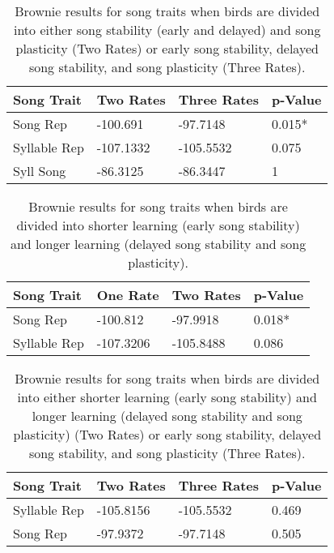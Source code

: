 \documentclass[a4paper,12pt]{article}
\begin{document}
\begin{table}[ht]
\caption{Brownie results for song traits when birds are divided into either song stability (early and delayed) and song plasticity (Two Rates) or early song stability, delayed song stability, and song plasticity (Three Rates).}
\centering
\begin{tabular}{llll}
  \hline
Song Trait & Two Rates & Three Rates & p-Value \\ 
  \hline
    Song Rep & -100.691 & -97.7148 & 0.015* \\ 
Syllable Rep & -107.1332 & -105.5532 & 0.075 \\ 
  Syll Song & -86.3125 & -86.3447 & 1 \\ 
   \hline
\end{tabular}
\end{table}



\begin{table}[ht]
\caption{Brownie results for song traits when birds are divided into shorter learning (early song stability) and longer learning (delayed song stability and song plasticity).}
\centering
\begin{tabular}{llll}
  \hline
Song Trait & One Rate & Two Rates & p-Value \\ 
  \hline
Song Rep & -100.812 & -97.9918 & 0.018* \\ 
  Syllable Rep & -107.3206 & -105.8488 & 0.086 \\ 
   \hline
\end{tabular}
\end{table}



\begin{table}[ht]
\caption{Brownie results for song traits when birds are divided into either shorter learning (early song stability) and longer learning (delayed song stability and song plasticity) (Two Rates) or early song stability, delayed song stability, and song plasticity (Three Rates).}
\label{tab:last}
\centering
\begin{tabular}{llll}
  \hline
Song Trait & Two Rates & Three Rates & p-Value \\ 
  \hline
Syllable Rep & -105.8156 & -105.5532 & 0.469 \\ 
  Song Rep & -97.9372 & -97.7148 & 0.505 \\ 
   \hline
\end{tabular}
\end{table}
\end{document}
